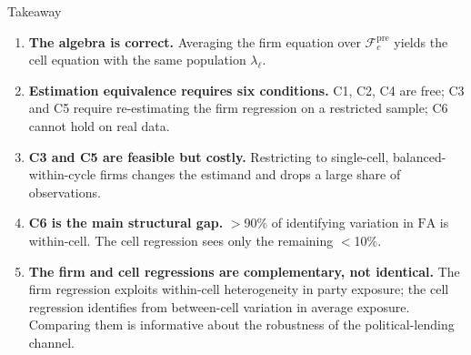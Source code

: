 \documentclass[aspectratio=169,11pt]{beamer}
\newcommand{\FA}{\mathrm{FA}}
\newcommand{\cFpre}{\mathcal{F}^{\mathrm{pre}}}
\begin{document}
\begin{frame}{Takeaway}

\small
\begin{enumerate}\setlength{\itemsep}{6pt}
  \item \textbf{The algebra is correct.}\; Averaging the firm equation over
        $\cFpre_c$ yields the cell equation with the same population $\lambda_\ell$.

  \item \textbf{Estimation equivalence requires six conditions.}\;
        C1, C2, C4 are free; C3 and C5 require re-estimating the firm
        regression on a restricted sample; C6 cannot hold on real data.

  \item \textbf{C3 and C5 are feasible but costly.}\; Restricting to
        single-cell, balanced-within-cycle firms changes the estimand and
        drops a large share of observations.

  \item \textbf{C6 is the main structural gap.}\; $>$90\% of identifying
        variation in $\FA$ is within-cell. The cell regression sees only the
        remaining $<$10\%.

  \item \textbf{The firm and cell regressions are complementary, not
        identical.}\; The firm regression exploits within-cell heterogeneity
        in party exposure; the cell regression identifies from between-cell
        variation in average exposure. Comparing them is informative about
        the robustness of the political-lending channel.
\end{enumerate}

\end{frame}
\end{document}
